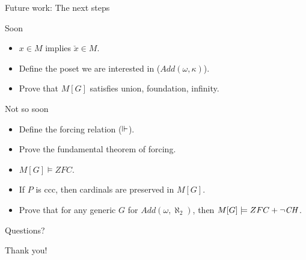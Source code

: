 \documentclass{beamer}
\begin{document}
\begin{frame}{Future work: The next steps}
  \begin{block}{Soon}
    \begin{itemize}
    \item $x \in M$ implies $\check{x}\in M$.
    \item Define the poset we are interested in ($Add(\omega,\kappa)$).
    \item Prove that $M[G]$ satisfies union, foundation, infinity.
    \end{itemize}
  \end{block}
  \begin{block}{Not so soon}
    \begin{itemize}
    \item Define the forcing relation ($\Vdash$).
    \item Prove the fundamental theorem of forcing.
    \item $M[G]\models ZFC$.
    \item If $P$ is ccc, then cardinals are preserved in $M[G]$.
    \item Prove that for any generic $G$ for $Add(\omega,\aleph_2)$,
      then $M[G]\models ZFC+\neg\mathit{CH}$.
    \end{itemize}
  \end{block}
\end{frame}


\begin{frame}{Questions?}
  \begin{center}
    \begin{block}{}
      \large{Thank you!}
    \end{block}
  \end{center}
\end{frame}
\end{document}
